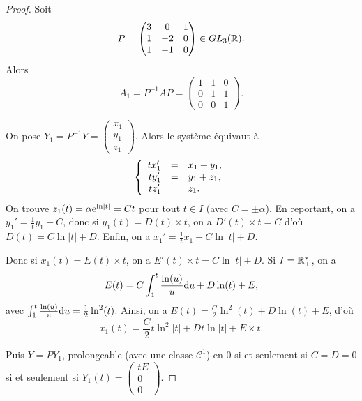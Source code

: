 \documentclass[12pt]{article}
\begin{document}
\begin{proof}
	Soit 
	\begin{equation}
		P=\begin{pmatrix}
			3&0&1\\
			1&-2&0\\
			1&-1&0
		\end{pmatrix}\in GL_{3}(\mathbb{R}).
	\end{equation}
	Alors 
	\begin{equation}
		A_{1}=P^{-1}AP=\begin{pmatrix}
			1&1&0\\
			0&1&1\\
			0&0&1
		\end{pmatrix}.
	\end{equation}

	On pose $Y_1=P^{-1}Y=\begin{pmatrix}
		x_1\\y_1\\z_1
	\end{pmatrix}$. Alors le système équivaut à 
	\begin{equation}
		\left\lbrace
			\begin{array}[]{rcl}
				tx_1' &=& x_1+y_1,\\
				ty_1' &=& y_1+z_1,\\
				tz_1' &=& z_1.
			\end{array}
		\right.
	\end{equation}
	On trouve $z_1(t)=\alpha\mathrm{e}^{\ln\left\lvert t\right\rvert}=C t$ pour tout $t\in I$ (avec $C=\pm\alpha$). En reportant, on a $y_1'=\frac{1}{t}y_1+C$, donc si $y_1(t)=D(t)\times t$, on a $D'(t)\times t=C$ d'où $D(t)=C\ln\left\lvert t\right\rvert+D$. Enfin, on a $x_1'=\frac{1}{t}x_1+C\ln\left\lvert t\right\rvert+D$.

	Donc si $x_1(t)=E(t)\times t$, on a $E'(t)\times t=C\ln\left\lvert t\right\rvert+D$. Si $I=\mathbb{R}_{+}^{*}$, on a 
	\begin{equation}
		E(t)=C\int_{1}^{t}\frac{\ln(u)}{u}\mathrm{d} u+D\ln(t)+E,
	\end{equation}
	avec $\int_{1}^{t}\frac{\ln(u)}{u}\mathrm{d} u=\frac{1}{2}\ln^{2}(t)$. Ainsi, on a $E(t)=\frac{C}{2}\ln^{2}(t)+D\ln(t)+E$, d'où 
	\begin{equation}
		x_1(t)=\frac{C}{2}t\ln^{2}\left\lvert t\right\rvert+Dt\ln\left\lvert t\right\rvert+E\times t.
	\end{equation}

	Puis $Y=PY_{1}$, prolongeable (avec une classe $\mathcal{C}^{1}$) en 0 si et seulement si $C=D=0$ si et seulement si $Y_1(t)=\begin{pmatrix}
		tE\\0\\0
	\end{pmatrix}$.
\end{proof}
\end{document}
